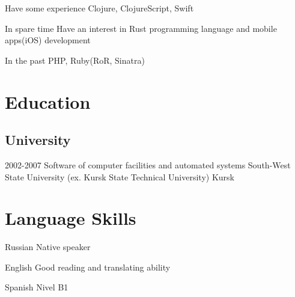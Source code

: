 \documentclass[11pt,a4paper,sans]{moderncv}
\newcommand{\lang}[2]{#2}
\begin{document}
\cvline
    {\lang
        {Имею небольшой опыт}
        {Have some experience}}
    {Clojure, ClojureScript, Swift}

\cvline
    {\lang
        {В свободное время}
        {In spare time}}
    {\lang
        {интересуюсь Rust}
        {Have an interest in Rust programming language and mobile apps(iOS) development}}

\cvline
    {\lang
        {В прошлом}
        {In the past}}
    {PHP, Ruby(RoR, Sinatra)}

\section
    {\lang
        {Образование}
        {Education}}

\subsection
    {\lang
        {Высшее образование}
        {University}}

\cventry
    {2002-2007}
    {\lang
        {Инженер по специальности «Программное обеспечение вычислительной техники и автоматизированных систем»}
        {Software of computer facilities and automated systems}}
    {\lang
        {«Юго-Западный государственный университет» (бывший «Курский государственный технический университет»)}
        {South-West State University (ex. Kursk State Technical University)}}
    {\lang
        {Курск}
        {Kursk}}
    {}
    {}

\section
    {\lang
        {Языки}
        {Language Skills}}

\cvlanguage
    {\lang
        {Русский}
        {Russian}}
    {\lang
        {родной язык}
        {Native speaker}}
    {}

\cvlanguage
    {\lang
        {Английский}
        {English}}
    {\lang
        {читаю техническую литературу, могу поддержать разговор}
        {Good reading and translating ability}}
    {}

\cvlanguage
    {\lang
        {Испанский}
        {Spanish}}
    {\lang
        {уровень B1}
        {Nivel B1}}
    {}
\end{document}
